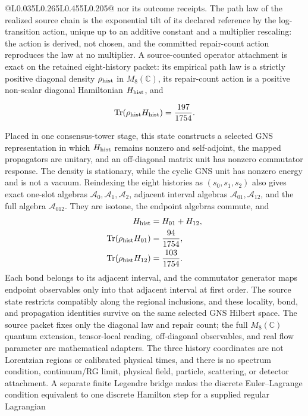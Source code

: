 \documentclass[10pt]{article}
\begin{document}
\begin{center}
\begin{longtable}{@{}L{0.035\linewidth}L{0.265\linewidth}L{0.455\linewidth}L{0.205\linewidth}@{}}
nor its outcome receipts.
The path law of the realized source chain is the exponential tilt of its
declared reference by the log-transition action, unique up to an additive
constant and a multiplier rescaling: the action is derived, not chosen, and
the committed repair-count action reproduces the law at no multiplier. A
source-counted operator attachment is exact on the retained eight-history
packet: its empirical path law is a strictly positive diagonal density
\(\rho_{\rm hist}\) in \(M_8(\mathbb C)\), its repair-count action is a
positive non-scalar diagonal Hamiltonian \(H_{\rm hist}\), and

\[
 \operatorname{Tr}(\rho_{\rm hist}H_{\rm hist})=\frac{197}{1754}.
\]

Placed in one consensus-tower stage, this state constructs a selected GNS
representation in which \(H_{\rm hist}\) remains nonzero and self-adjoint,
the mapped propagators are unitary, and an off-diagonal matrix unit has
nonzero commutator response. The density is stationary, while the cyclic GNS
unit has nonzero energy and is not a vacuum. Reindexing the eight histories as
\((s_0,s_1,s_2)\) also gives exact one-slot algebras
\(\mathcal A_0,\mathcal A_1,\mathcal A_2\), adjacent interval algebras
\(\mathcal A_{01},\mathcal A_{12}\), and the full algebra
\(\mathcal A_{012}\). They are isotone, the endpoint algebras commute, and
\[
 \begin{aligned}
 H_{\rm hist}&=H_{01}+H_{12},\\
 \operatorname{Tr}(\rho_{\rm hist}H_{01})&=\frac{94}{1754},\\
 \operatorname{Tr}(\rho_{\rm hist}H_{12})&=\frac{103}{1754}.
 \end{aligned}
\]
Each bond belongs to its adjacent interval, and the commutator generator maps
endpoint observables only into that adjacent interval at first order. The
source state restricts compatibly along the regional inclusions, and these
locality, bond, and propagation identities survive on the same selected GNS
Hilbert space. The source packet fixes only the diagonal law and repair count;
the full \(M_8(\mathbb C)\) quantum extension, tensor-local reading,
off-diagonal observables, and real flow parameter are mathematical adapters.
The three history coordinates are not Lorentzian regions or calibrated
physical times, and there is no spectrum condition, continuum/RG limit,
physical field, particle, scattering, or detector attachment. A
separate finite Legendre bridge makes the discrete Euler--Lagrange condition
equivalent to one discrete Hamilton step for a supplied regular Lagrangian

\end{longtable}
\end{center}
\end{document}

